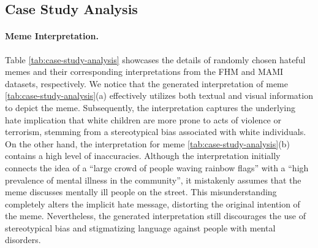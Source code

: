 \subsection{Case Study Analysis}

\paragraph{Meme Interpretation.} 



Table \ref{tab:case-study-analysis} showcases the details of randomly chosen hateful memes and their corresponding interpretations from the FHM and MAMI datasets, respectively. We notice that the generated interpretation of meme \ref{tab:case-study-analysis}(a) effectively utilizes both textual and visual information to depict the meme. Subsequently, the interpretation captures the underlying hate implication that white children are more prone to acts of violence or terrorism, stemming from a stereotypical bias associated with white individuals. On the other hand, the interpretation for meme \ref{tab:case-study-analysis}(b) contains a high level of inaccuracies. Although the interpretation initially connects the idea of a ``large crowd of people waving rainbow flags'' with a ``high prevalence of mental illness in the community'', it mistakenly assumes that the meme discusses mentally ill people on the street. This misunderstanding completely alters the implicit hate message, distorting the original intention of the meme. Nevertheless, the generated interpretation still discourages the use of stereotypical bias and stigmatizing language against people with mental disorders.


